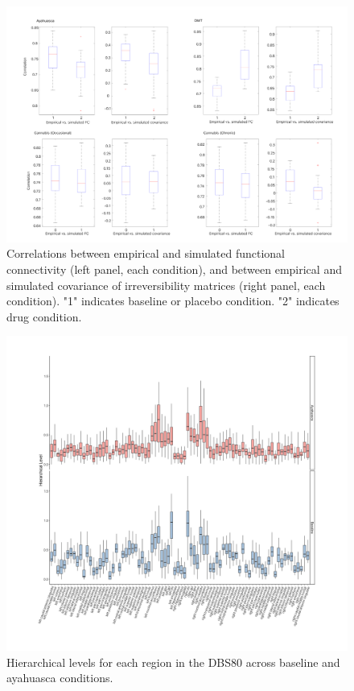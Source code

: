 \begin{figure}[h]
    \centering
    \includegraphics[width=\textwidth]{images/Appendix_ Fits.png}
    \caption{Correlations between empirical and simulated functional connectivity (left panel, each condition), and between empirical and simulated covariance of irreversibility matrices (right panel, each condition). "1" indicates baseline or placebo condition. "2" indicates drug condition.}
    \label{fig:fits}
\end{figure}

\begin{figure}
    \centering
    \includegraphics[width=\textwidth]{images/Appendix_ AYA HL.png}
    \caption{Hierarchical levels for each region in the DBS80 across baseline and ayahuasca conditions.}
    \label{fig:ayahl}
\end{figure}

